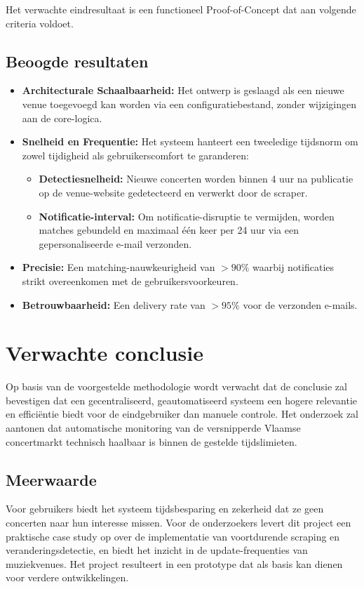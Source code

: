 Het verwachte eindresultaat is een functioneel Proof-of-Concept dat aan volgende criteria voldoet.

\subsection{Beoogde resultaten}
\begin{itemize}
    \item \textbf{Architecturale Schaalbaarheid:} Het ontwerp is geslaagd als een nieuwe venue toegevoegd kan worden via een configuratiebestand, zonder wijzigingen aan de core-logica.
    \item \textbf{Snelheid en Frequentie:} Het systeem hanteert een tweeledige tijdsnorm om zowel tijdigheid als gebruikerscomfort te garanderen:
    \begin{itemize}
        \item \textbf{Detectiesnelheid:} Nieuwe concerten worden binnen 4 uur na publicatie op de venue-website gedetecteerd en verwerkt door de scraper.
        \item \textbf{Notificatie-interval:} Om notificatie-disruptie te vermijden, worden matches gebundeld en maximaal één keer per 24 uur via een gepersonaliseerde e-mail verzonden.
    \end{itemize}
    \item \textbf{Precisie:} Een matching-nauwkeurigheid van $>90\%$ waarbij notificaties strikt overeenkomen met de gebruikersvoorkeuren.
    \item \textbf{Betrouwbaarheid:} Een delivery rate van $>95\%$ voor de verzonden e-mails.
\end{itemize}

\section{Verwachte conclusie}
\label{sec:conclusie}

Op basis van de voorgestelde methodologie wordt verwacht dat de conclusie zal bevestigen dat een gecentraliseerd, geautomatiseerd systeem een hogere relevantie en efficiëntie biedt voor de eindgebruiker dan manuele controle. Het onderzoek zal aantonen dat automatische monitoring van de versnipperde Vlaamse concertmarkt technisch haalbaar is binnen de gestelde tijdslimieten.

\subsection{Meerwaarde}
Voor gebruikers biedt het systeem tijdsbesparing en zekerheid dat ze geen concerten naar hun interesse missen. Voor de onderzoekers levert dit project een praktische case study op over de implementatie van voortdurende scraping en veranderingsdetectie, en biedt het inzicht in de update-frequenties van muziekvenues. Het project resulteert in een prototype dat als basis kan dienen voor verdere ontwikkelingen.